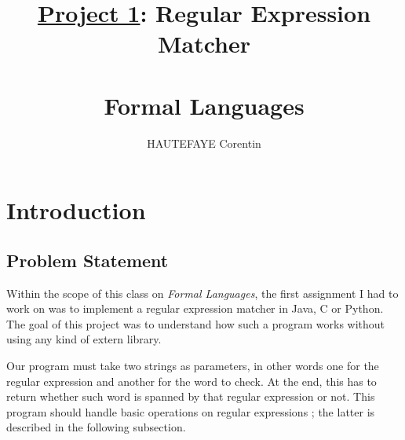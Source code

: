 \documentclass[a4paper,11pt,titlepage]{article}
\title{\underline{Project 1}: Regular Expression Matcher\\\;\\Formal Languages}
\author{HAUTEFAYE Corentin}
\begin{document}

\maketitle
\newpage

\tableofcontents
\newpage
\section{Introduction}

\subsection{Problem Statement}
Within the scope of this class on \textit{Formal Languages}, the first assignment I had to work on was to implement a regular expression matcher in Java, C or Python. The goal of this project was to understand how such a program works without using any kind of extern library.

Our program must take two strings as parameters, in other words one for the regular expression and another for the word to check. At the end, this has to return whether such word is spanned by that regular expression or not. This program should handle basic operations on regular expressions ; the latter is described in the following subsection.
\end{document}
